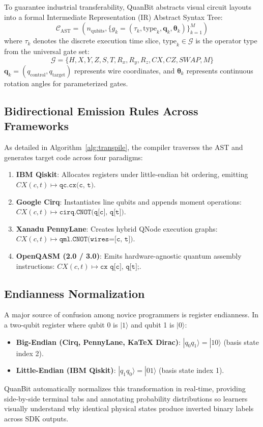 \documentclass[conference]{IEEEtran}
\begin{document}
To guarantee industrial transferability, QuanBit abstracts visual circuit layouts into a formal Intermediate Representation (IR) Abstract Syntax Tree:
\begin{equation}
\mathcal{C}_{\text{AST}} = \left( n_{\text{qubits}}, \{ g_k = (\tau_k, \text{type}_k, \mathbf{q}_k, \mathbf{\theta}_k) \}_{k=1}^M \right)
\end{equation}
where $\tau_k$ denotes the discrete execution time slice, $\text{type}_k \in \mathcal{G}$ is the operator type from the universal gate set:
\begin{equation}
\mathcal{G} = \{ H, X, Y, Z, S, T, R_x, R_y, R_z, CX, CZ, SWAP, M \}
\end{equation}
$\mathbf{q}_k = (q_{\text{control}}, q_{\text{target}})$ represents wire coordinates, and $\mathbf{\theta}_k$ represents continuous rotation angles for parameterized gates.

\subsection{Bidirectional Emission Rules Across Frameworks}
As detailed in Algorithm~\ref{alg:transpile}, the compiler traverses the AST and generates target code across four paradigms:
\begin{enumerate}[leftmargin=*,itemsep=3pt]
    \item \textbf{IBM Qiskit}: Allocates registers under little-endian bit ordering, emitting $CX(c, t) \mapsto \texttt{qc.cx(c, t)}$.
    \item \textbf{Google Cirq}: Instantiates line qubits and appends moment operations: $CX(c, t) \mapsto \texttt{cirq.CNOT(q[c], q[t])}$.
    \item \textbf{Xanadu PennyLane}: Creates hybrid QNode execution graphs: $CX(c, t) \mapsto \texttt{qml.CNOT(wires=[c, t])}$.
    \item \textbf{OpenQASM (2.0 / 3.0)}: Emits hardware-agnostic quantum assembly instructions: $CX(c, t) \mapsto \texttt{cx q[c], q[t];}$.
\end{enumerate}

\subsection{Endianness Normalization}
A major source of confusion among novice programmers is register endianness. In a two-qubit register where qubit 0 is $|1\rangle$ and qubit 1 is $|0\rangle$:
\begin{itemize}[leftmargin=*,itemsep=2pt]
    \item \textbf{Big-Endian (Cirq, PennyLane, KaTeX Dirac)}: $|q_0 q_1\rangle = |10\rangle$ (basis state index 2).
    \item \textbf{Little-Endian (IBM Qiskit)}: $|q_1 q_0\rangle = |01\rangle$ (basis state index 1).
\end{itemize}
QuanBit automatically normalizes this transformation in real-time, providing side-by-side terminal tabs and annotating probability distributions so learners visually understand why identical physical states produce inverted binary labels across SDK outputs.
\end{document}
